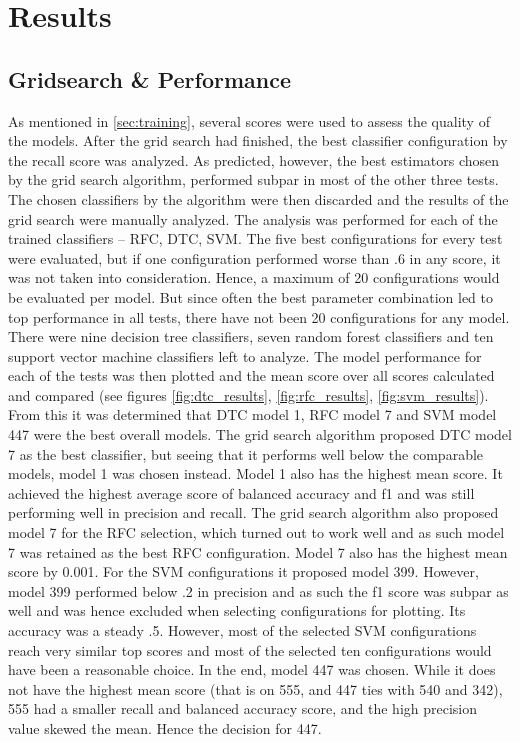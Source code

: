 
\section{Results}
\label{sec:results}
\subsection{Gridsearch \& Performance}
As mentioned in \ref{sec:training}, several scores were used to assess the quality of the models. After the grid search had finished, the best classifier configuration by the recall score was analyzed. As predicted, however, the best estimators chosen by the grid search algorithm, performed subpar in most of the other three tests. The chosen classifiers by the algorithm were then discarded and the results of the grid search were manually analyzed. The analysis was performed for each of the trained classifiers -- RFC, DTC, SVM. The five best configurations for every test were evaluated, but if one configuration performed worse than .6 in any score, it was not taken into consideration. Hence, a maximum of 20 configurations would be evaluated per model. But since often the best parameter combination led to top performance in all tests, there have not been 20 configurations for any model. There were nine decision tree classifiers, seven random forest classifiers and ten support vector machine classifiers left to analyze. The model performance for each of the tests was then plotted and the mean score over all scores calculated and compared (see figures \ref{fig:dtc_results}, \ref{fig:rfc_results}, \ref{fig:svm_results}). From this it was determined that DTC model 1, RFC model 7 and SVM model 447 were the best overall models. The grid search algorithm proposed DTC model 7 as the best classifier, but seeing that it performs well below the comparable models, model 1 was chosen instead. Model 1 also has the highest mean score. It achieved the highest average score of balanced accuracy and f1 and was still performing well in precision and recall. The grid search algorithm also proposed model 7 for the RFC selection, which turned out to work well and as such model 7 was retained as the best RFC configuration. Model 7 also has the highest mean score by 0.001. For the SVM configurations it proposed model 399. However, model 399 performed below .2 in precision and as such the f1 score was subpar as well and was hence excluded when selecting configurations for plotting. Its accuracy was a steady .5. However, most of the selected SVM configurations reach very similar top scores and most of the selected ten configurations would have been a reasonable choice. In the end, model 447 was chosen. While it does not have the highest mean score (that is on 555, and 447 ties with 540 and 342), 555 had a smaller recall and balanced accuracy score, and the high precision value skewed the mean. Hence the decision for 447.\\
